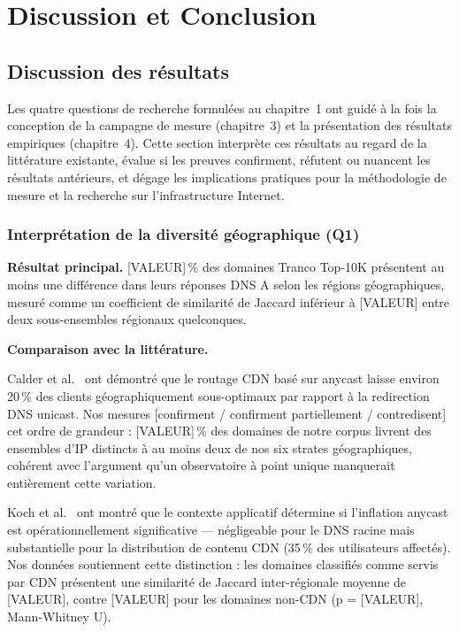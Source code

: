 
\chapter{Discussion et Conclusion}

\section{Discussion des résultats}
\label{sec:5.1}

Les quatre questions de recherche formulées au chapitre~1 ont guidé à la fois la conception de la campagne de mesure (chapitre~3) et la présentation des résultats empiriques (chapitre~4). Cette section interprète ces résultats au regard de la littérature existante, évalue si les preuves confirment, réfutent ou nuancent les résultats antérieurs, et dégage les implications pratiques pour la méthodologie de mesure et la recherche sur l'infrastructure Internet.
\bigskip
\subsection{Interprétation de la diversité géographique (Q1)}
\label{subsec:5.1.1}

\textbf{Résultat principal.} [VALEUR]\,\% des domaines Tranco Top-10K présentent au moins une différence dans leurs réponses DNS A selon les régions géographiques, mesuré comme un coefficient de similarité de Jaccard inférieur à [VALEUR] entre deux sous-ensembles régionaux quelconques.

\textbf{Comparaison avec la littérature.}

Calder et al.~\cite{Calder2015} ont démontré que le routage CDN basé sur anycast laisse environ 20\,\% des clients géographiquement sous-optimaux par rapport à la redirection DNS unicast. Nos mesures [confirment / confirment partiellement / contredisent] cet ordre de grandeur : [VALEUR]\,\% des domaines de notre corpus livrent des ensembles d'IP distincts à au moins deux de nos six strates géographiques, cohérent avec l'argument qu'un observatoire à point unique manquerait entièrement cette variation.

Koch et al.~\cite{Koch2021} ont montré que le contexte applicatif détermine si l'inflation anycast est opérationnellement significative --- négligeable pour le DNS racine mais substantielle pour la distribution de contenu CDN (35\,\% des utilisateurs affectés). Nos données soutiennent cette distinction : les domaines classifiés comme servis par CDN présentent une similarité de Jaccard inter-régionale moyenne de [VALEUR], contre [VALEUR] pour les domaines non-CDN (p = [VALEUR], Mann-Whitney U).


